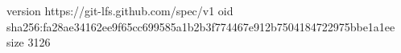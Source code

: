 version https://git-lfs.github.com/spec/v1
oid sha256:fa28ae34162ee9f65cc699585a1b2b3f774467e912b7504184722975bbe1a1ee
size 3126
